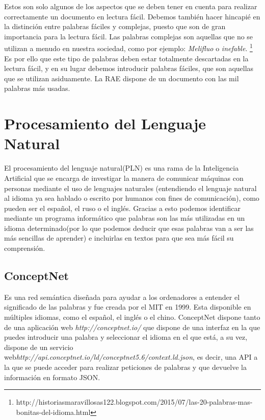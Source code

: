 Estos son solo algunos de los aspectos que se deben tener en cuenta para realizar correctamente un documento en lectura fácil. \newline
Debemos también hacer hincapié en la distinción entre palabras fáciles y complejas, puesto que son de gran importancia para la lectura fácil. 
Las palabras complejas son aquellas que no se utilizan a menudo en nuestra sociedad, como por ejemplo: \textit{Melifluo} o \textit{inefable}.
\footnote{http://historiasmaravillosas122.blogspot.com/2015/07/las-20-palabras-mas-bonitas-del-idioma.html}
Es por ello que este tipo de palabras deben estar totalmente descartadas en la lectura fácil, y en su lugar debemos introducir palabras fáciles, que son aquellas que se utilizan asiduamente. La RAE dispone de un documento con las mil palabras más usadas.


\section{Procesamiento del Lenguaje Natural}
 
El procesamiento del lenguaje natural(PLN) es una rama de la Inteligencia Artificial que se encarga de investigar la manera de comunicar máquinas con personas mediante el uso de lenguajes naturales (entendiendo el lenguaje natural al idioma ya sea hablado o escrito por humanos con fines de comunicación), como pueden ser el español, el ruso o el inglés. Gracias a esto podemos identificar mediante un programa informático que palabras son las más utilizadas en un idioma determinado(por lo que podemos deducir que esas palabras van a ser las más sencillas de aprender) e incluirlas en textos para que sea más fácil su comprensión.

\subsection{ConceptNet} 

Es una red semántica diseñada para ayudar a los ordenadores a entender el significado de las palabras y fue creada por el MIT en 1999. Esta disponible en múltiples idiomas, como el español, el inglés o el chino. ConceptNet dispone tanto de una aplicación web \textit{http://conceptnet.io/} 
	 que dispone de una interfaz en la que puedes introducir una palabra y seleccionar el idioma en el que está, a su vez, dispone de un servicio web\textit{http://api.conceptnet.io/ld/conceptnet5.6/context.ld.json}, es decir, una API a la que se puede acceder para realizar peticiones de palabras y que devuelve la información en formato JSON.


